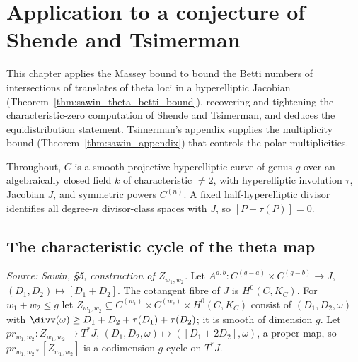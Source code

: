 \section{Application to a conjecture of Shende and Tsimerman}


This chapter applies the Massey bound to bound the Betti numbers of intersections
of translates of theta loci in a hyperelliptic Jacobian
(Theorem~\ref{thm:sawin_theta_betti_bound}), recovering and tightening the
characteristic-zero computation of Shende and Tsimerman, and deduces the
equidistribution statement.  Tsimerman's appendix supplies the multiplicity bound
(Theorem~\ref{thm:sawin_appendix}) that controls the polar multiplicities.

Throughout, $C$ is a smooth projective hyperelliptic curve of genus $g$ over an
algebraically closed field $k$ of characteristic $\ne 2$, with hyperelliptic
involution $\tau$, Jacobian $J$, and symmetric powers $C^{(n)}$.  A fixed
half-hyperelliptic divisor identifies all degree-$n$ divisor-class spaces with
$J$, so $[P+\tau(P)]=0$.

\subsection{The characteristic cycle of the theta map}

\begin{definition}
  \label{def:sawin_Z_locus}
  \textit{Source: Sawin, §5, construction of $Z_{w_1,w_2}$.}
  Let $\underline A^{a,b}:C^{(g-a)}\times C^{(g-b)}\to J$, $(D_1,D_2)\mapsto
  [D_1+D_2]$.  The cotangent fibre of $J$ is $H^0(C,K_C)$.  For $w_1+w_2\le g$ let
  $Z_{w_1,w_2}\subseteq C^{(w_1)}\times C^{(w_2)}\times H^0(C,K_C)$ consist of
  $(D_1,D_2,\omega)$ with $\divv(\omega)\ge D_1+D_2+\tau(D_1)+\tau(D_2)$; it is
  smooth of dimension $g$.  Let $pr_{w_1,w_2}:Z_{w_1,w_2}\to T^*J$,
  $(D_1,D_2,\omega)\mapsto([D_1+2D_2],\omega)$, a proper map, so
  $pr_{w_1,w_2*}[Z_{w_1,w_2}]$ is a codimension-$g$ cycle on $T^*J$.
\end{definition}

